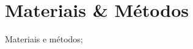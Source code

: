 \chapter[Materiais \& Métodos]{Materiais \& Métodos}\label{MateriaisMétodos}

Materiais e métodos;


  

  
